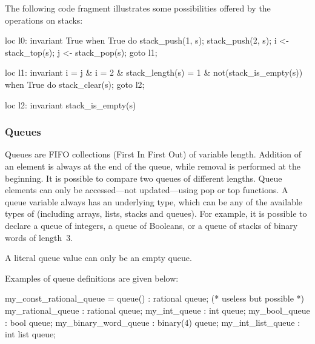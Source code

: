 \begin{example}
	The following code fragment illustrates some possibilities offered by the operations on stacks:

\begin{IMITATORmodel}
loc l0: invariant True
	when True do {
		stack_push(1, s);
		stack_push(2, s);
		i <- stack_top(s);
		j <- stack_pop(s);
	}
	goto l1;

loc l1: invariant
	i = j
	& i = 2
	& stack_length(s) = 1
	& not(stack_is_empty(s))
	when True do { stack_clear(s); }
	goto l2;

loc l2: invariant stack_is_empty(s)
\end{IMITATORmodel}

\end{example}



\subsubsection{Queues}

Queues are FIFO collections (First In First Out) of variable length.
Addition of an element is always at the end of the queue, while removal is performed at the beginning.
It is possible to compare two queues of different lengths.
Queue elements can only be accessed---not updated---using pop or top functions.
A queue variable always has an underlying type, which can be any of the available types of \imitator{} (including arrays, lists, stacks and queues).
For example, it is possible to declare a queue of integers, a queue of Booleans, or a queue of stacks of binary words of length~3.

\begin{remark}
A literal queue value can only be an empty queue.
\end{remark}

Examples of queue definitions are given below:

\begin{IMITATORmodel}
	my_const_rational_queue = queue() : rational queue; (* useless but possible *)
	my_rational_queue			: rational queue;
	my_int_queue					: int queue;
	my_bool_queue        	: bool queue;
	my_binary_word_queue 	: binary(4) queue;
	my_int_list_queue     : int list queue;
\end{IMITATORmodel}


